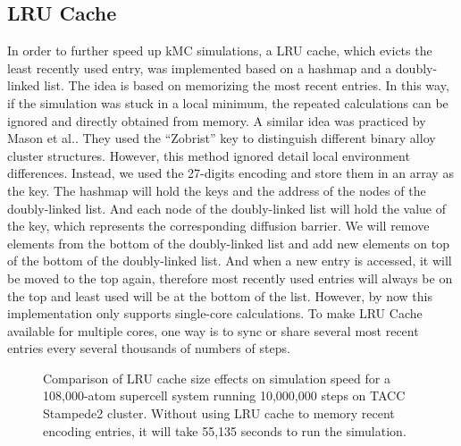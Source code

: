 \subsection{\acf{LRU} Cache}
\label{Chap:Al/Vac:sec:LRU}
In order to further speed up \ac{kMC} simulations, a \acf{LRU} cache, which evicts the least recently used entry, was implemented based on a hashmap and a  doubly-linked list. The idea is based on memorizing the most recent entries. In this way, if the simulation was stuck in a local minimum, the repeated calculations can be ignored and directly obtained from memory. A similar idea was practiced by Mason et al.\cite{mason2005fast}. They used the ``Zobrist'' key to distinguish different binary alloy cluster structures. However, this method ignored detail local environment differences. Instead, we used the 27-digits encoding and store them in an array as the key. The hashmap will hold the keys and the address of the nodes of the doubly-linked list. And each node of the doubly-linked list will hold the value of the key, which represents the corresponding diffusion barrier. We will remove elements from the bottom of the doubly-linked list and add new elements on top of the bottom of the doubly-linked list. And when a new entry is accessed, it will be moved to the top again, therefore most recently used entries will always be on the top and least used will be at the bottom of the list. However, by now this implementation only supports single-core calculations. To make \ac{LRU} Cache available for multiple cores, one way is to sync or share several most recent entries every several thousands of numbers of steps.


\begingroup
\begin{figure}[!ht]
  \centering
\caption[Comparison of \acs{LRU} cache size effects on simulation speed for a 108,000-atom supercell system running 10,000,000 steps on TACC Stampede2 cluster.]{Comparison of \acs{LRU} cache size effects on simulation speed for a 108,000-atom supercell system running 10,000,000 steps on TACC Stampede2 cluster. Without using \ac{LRU} cache to memory recent encoding entries, it will take 55,135 seconds to run the simulation.}
\label{Chap:Al/Vac:fig:lru_size}
\end{figure}
\endgroup


